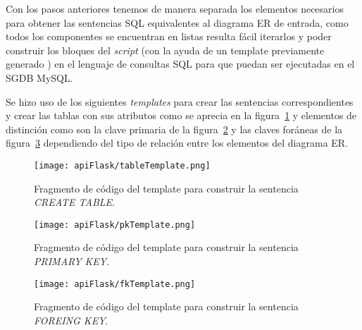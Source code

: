 Con los pasos anteriores tenemos de manera separada los elementos necesarios para obtener las sentencias SQL equivalentes al diagrama ER de entrada, como todos los componentes se encuentran en listas resulta fácil iterarlos y poder construir los bloques del \textit{script} (con la ayuda de un template previamente generado ) en el lenguaje de consultas SQL para que puedan ser ejecutadas en el SGDB MySQL.

Se hizo uso de los siguientes \textit{templates} para crear las sentencias correspondientes y crear las tablas con sus atributos como se aprecia en la figura~\ref{img:templateTable} y elementos de distinción como son la clave primaria de la figura~\ref{img:pkTemplate} y las claves foráneas de la figura~\ref{img:fkTemplate} dependiendo del tipo de relación entre los elementos del diagrama ER.


\begin{figure}[H]
  \centering
  \texttt{[image: apiFlask/tableTemplate.png]}
  \caption{Fragmento de código del template para construir la sentencia \textit{CREATE TABLE}.}
  \label{img:templateTable}
\end{figure}

\begin{figure}[H]
  \centering
  \texttt{[image: apiFlask/pkTemplate.png]}
  \caption{Fragmento de código del template para construir la sentencia \textit{PRIMARY KEY}.}
  \label{img:pkTemplate}
\end{figure}

\begin{figure}[H]
  \centering
  \texttt{[image: apiFlask/fkTemplate.png]}
  \caption{Fragmento de código del template para construir la sentencia \textit{FOREING KEY}.}
  \label{img:fkTemplate}
\end{figure}